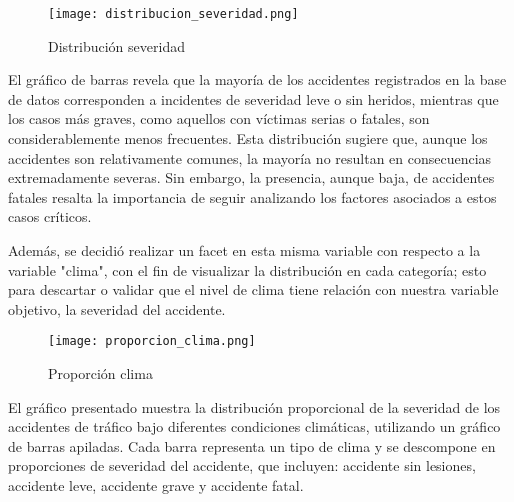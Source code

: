 \documentclass{book}
\begin{document}
\begin{figure}[htbp]
\centering
\texttt{[image: distribucion\_severidad.png]}
\caption{\label{fig:distribución severidad}Distribución severidad}
\end{figure}

El gráfico de barras revela que la mayoría de los accidentes registrados en la base de datos corresponden a incidentes de severidad leve o sin heridos, mientras que los casos más graves, como aquellos con víctimas serias o fatales, son considerablemente menos frecuentes. Esta distribución sugiere que, aunque los accidentes son relativamente comunes, la mayoría no resultan en consecuencias extremadamente severas. Sin embargo, la presencia, aunque baja, de accidentes fatales resalta la importancia de seguir analizando los factores asociados a estos casos críticos.

Además, se decidió realizar un facet en esta misma variable con respecto a la variable "clima", con el fin de visualizar la distribución en cada categoría; esto para descartar o validar que el nivel de clima tiene relación con nuestra variable objetivo, la severidad del accidente.

\begin{figure}[htbp]
\centering
\texttt{[image: proporcion\_clima.png]}
\caption{\label{fig:proporción clima}Proporción clima}
\end{figure}

El gráfico presentado muestra la distribución proporcional de la severidad de los accidentes de tráfico bajo diferentes condiciones climáticas, utilizando un gráfico de barras apiladas. Cada barra representa un tipo de clima y se descompone en proporciones de severidad del accidente, que incluyen: accidente sin lesiones, accidente leve, accidente grave y accidente fatal.
\end{document}
